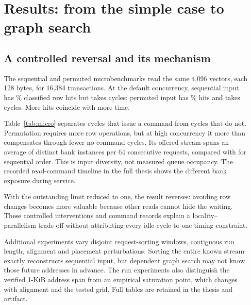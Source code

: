\documentclass[conference]{IEEEtran}
\begin{document}
\section{Results: from the simple case to graph search}
\subsection{A controlled reversal and its mechanism}
The sequential and permuted microbenchmarks read the same 4,096 vectors, each 128 bytes, for 16,384 transactions. At the default concurrency, sequential input has \SequentialHit\% classified row hits but takes \SequentialCycles{} cycles; permuted input has \RandomHit\% hits and takes \RandomCycles{} cycles. More hits coincide with more time.

\begin{table}[htbp]\centering\small\setlength{\tabcolsep}{4pt}
\caption{Command-level explanation of the controlled ordering experiment. Limit is the maximum number of outstanding reads. ACT opens a row; PRE closes one. ``No command'' counts controller cycles in which no command issues, including timing waits and final draining. It is not a count of one specific stall cause.}\label{tab:micro}

\end{table}

Table~\ref{tab:micro} separates cycles that issue a command from cycles that do not. Permutation requires more row operations, but at high concurrency it more than compensates through fewer no-command cycles. Its offered stream spans an average of \RandomBanks{} distinct bank instances per 64 consecutive requests, compared with \SequentialBanks{} for sequential order. This is input diversity, not measured queue occupancy. The recorded read-command timeline in the full thesis shows the different bank exposure during service.



With the outstanding limit reduced to one, the result reverses: avoiding row changes becomes more valuable because other reads cannot hide the waiting. These controlled interventions and command records explain a locality--parallelism trade-off without attributing every idle cycle to one timing constraint.

Additional experiments vary disjoint request-sorting windows, contiguous run length, alignment and placement perturbations. Sorting the entire known stream exactly reconstructs sequential input, but dependent graph search may not know those future addresses in advance. The run experiments also distinguish the verified 1-KiB address span from an empirical saturation point, which changes with alignment and the tested grid. Full tables are retained in the thesis and artifact.
\end{document}

